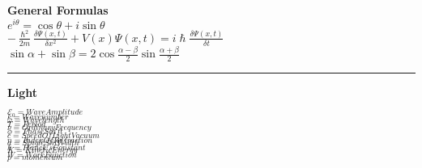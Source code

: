 \documentclass[0pt]{report}
\begin{document}
\setlength{\multicolsep}{1pt plus 0.5pt minus 0.5pt}
\begin{multicols}{3}
\begin{flushleft}
\setlength{\abovedisplayskip}{1pt}
\setlength{\belowdisplayskip}{1pt}
\setlength{\abovedisplayshortskip}{1pt}
\setlength{\belowdisplayshortskip}{1pt}
\textbf{General Formulas}\\


$e^{i\theta}=\cos\theta+i\sin\theta$\\
$-\frac{\hslash^2}{2m}\frac{\delta\Psi(x,t)}{\delta x^2}+V(x)\Psi(x,t)=i\hslash\frac{\delta\Psi(x,t)}{\delta t}$\\
$\sin\alpha+\sin\beta=2\cos\frac{\alpha-\beta}{2}\sin\frac{\alpha+\beta}{2}$\\
\noindent\rule[0.5ex]{\linewidth}{1pt}
\textbf{Light}\\

\begin{multicols}{2}
$_{\mathcal{E}_0=WaveAmplitude}$\\
$_{k=Wavenumber}$\\
$_{\omega=Wavelength}$\\
$_{T=Period}$\\
$_{\nu=OrdinaryFrequency}$\\
$_{\phi=PhaseShift}$\\
$_{c=SpeedOfLightVacuum}$\\
$_{n=IndexOfRefraction}$\\
$_{a=SingleSlitWidth}$\\
$_{h=Planck'sConstant}$\\
$_{K=KineticEnergy}$\\
$_{W=WorkFunction}$\\
$_{p=momentum}$\\
\end{multicols}


\end{flushleft}
\end{multicols}
\end{document}
